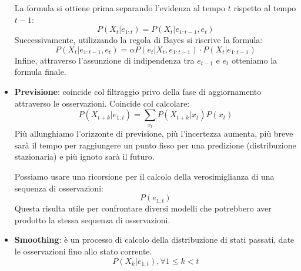 \begin{itemize}
          La formula si ottiene prima separando l'evidenza al tempo $t$
          rispetto al tempo $t - 1$:
          \begin{equation*}
              P(X_{t} | e_{1:t}) = P(X_{t} | e_{1:t - 1}, e_{t})
          \end{equation*}
          Successivamente, utilizzando la regola di Bayes si riscrive la formula:
          \begin{equation*}
              P(X_{t} | e_{1:t - 1}, e_{t}) = \alpha P(e_{t}|X_{t}, e_{1:t-1})\cdot P(X_{t}|e_{1:t-1})
          \end{equation*}
          Infine, attraverso l'assunzione di indipendenza tra $e_{t - 1}$ e $e_{t}$
          otteniamo la formula finale.
    \item \textbf{Previsione}: coincide col filtraggio privo della fase di
          aggiornamento attraverso le osservazioni. Coincide col calcolare:
          \begin{equation}
              P(X_{t+k } | e_{1:t}) = \sum_{x_t} P(X_{t+k}|x_t) P(x_t)
          \end{equation}
          Più allunghiamo l'orizzonte di previsione, più l'incertezza aumenta,
          più breve sarà il tempo per raggiungere un punto fisso per una predizione
          (distribuzione stazionaria) e più ignoto sarà il futuro.

          Possiamo usare una ricorsione per il calcolo della verosimiglianza di
          una sequenza di osservazioni:
          \begin{equation*}
              P(e_{1:t})
          \end{equation*}
          Questa risulta utile per confrontare diversi modelli che potrebbero
          aver prodotto la stessa sequenza di osservazioni.
    \item \textbf{Smoothing}: è un processo di calcolo della distribuzione di
          stati passati, date le osservazioni fino allo stato corrente.
          \begin{equation}
              P(X_k | e_{1:t}), \forall 1 \leq k < t
          \end{equation}


\end{itemize}
